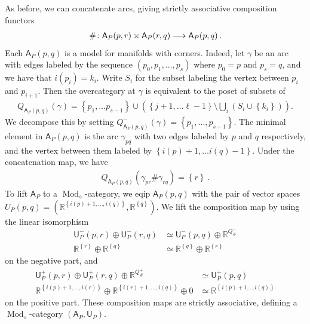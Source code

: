 \documentclass[10pt]{amsart}
\numberwithin{equation}{section}
\theoremstyle{definition}
\DeclareMathOperator{\Mod}{Mod}
\newcommand{\bR}{\mathbb{R}}
\newcommand{\sfA}{\mathsf{A}}
\newcommand{\sfU}{\mathsf{U}}
\renewcommand{\to}{\mathchoice{\longrightarrow}{\rightarrow}{}{}}
\begin{document}
As before, we can concatenate arcs, giving strictly associative composition functors
\begin{align*}
	\#\colon \sfA_P(p,r)\times \sfA_P(r,q) \to \sfA_P(p,q) \,.
\end{align*}
Each $\sfA_P(p,q)$ is a model for manifolds with corners.
Indeed, let $\gamma$ be an arc with edges labeled by the sequence $(p_{0},p_1,\ldots, p_s)$ where $p_0=p$ and  $p_s=q$, and we have that $i(p_{i})= k_i$.
Write $S_i$ for the subset labeling the vertex between $p_i$ and $p_{i+1}$.
Then the overcategory at $\gamma$ is equivalent to the poset of subsets of
\begin{align*}
	Q_{\sfA_P(p,q)}(\gamma) = \left\{ p_{1},\ldots p_{s-1} \right\} \cup  \left( \left\{ j+1,\ldots \ell -1 \right\} \setminus \bigcup_{i} (S_{i}\cup \left\{ k_i \right\})  \right).
\end{align*}
We decompose this by setting $Q^{-}_{\sfA_{P}(p,q)}(\gamma) = \left\{ p_1,\ldots , p_{s-1}\right\}$. The minimal element in $\sfA_P(p,q)$ is the arc $\gamma_{pq}$ with two edges labeled by $p$ and $q$ respectively, and the vertex between them labeled by $\left\{i(p)+1,\ldots i(q)-1 \right\}$.
Under the concatenation map, we have
\begin{align*}
	Q_{\sfA_P(p,q)} (\gamma_{pr} \# \gamma_{rq} ) = \left\{ r \right\} \,.
\end{align*}
To lift $\sfA_{P}$ to a $\Mod_{\diamond}$-category, we eqip $\sfA_{P}(p,q)$ with the pair of vector spaces $U_P(p,q) = \left(\bR^{ \left\{ i(p)+1, \ldots, i(q) \right\}}, \bR^{ \left\{ q\right\}} \right)$.
We lift the composition map by using the linear isomorphism
\begin{align}\label{eq:Flow_simplex_U_iso}
	\sfU^{-}_{P}(p,r)
	\oplus \sfU^{-}_{P}(r,q)
	&\simeq \sfU^{-}_{P}(p,q) \oplus \bR^{Q_{\#}^{-}} \\
	\bR^{ \left\{ r\right\}}
	\oplus \bR^{ \left\{ q\right\}}
	&\simeq  \bR^{ \left\{ q\right\}} \oplus \bR^{ \left\{ r\right\}}  \nonumber
\end{align}
on the negative part, and
\begin{align*}
	\sfU^{+}_{P}(p,r) \oplus \sfU^{+}_{P}(r,q) \oplus \bR^{Q_{\#}^{+}} &\simeq \sfU^{+}_{P}(p,q) \\
	\bR^{ \left\{ i(p)+1,\dots,i(r)\right\}} \oplus \bR^{ \left\{ i(r)+1, \dots, i(q)\right\}} \oplus 0 &\simeq \bR^{ \left\{ i(p)+1,\dots i(q) \right\}}
\end{align*}
on the positive part.
These composition maps are strictly associative, defining a $\Mod_{\diamond}$-category $(\sfA_{P},\sfU_{P})$.
\end{document}
